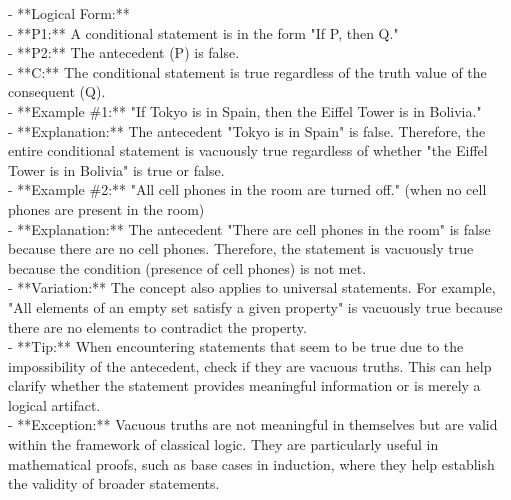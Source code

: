\documentclass[a4paper,12pt,single,pdftex]{scrbook}
\begin{document}
    
      - **Logical Form:**
    \\

    
        - **P1:** A conditional statement is in the form "If P, then Q."
    \\

    
        - **P2:** The antecedent (P) is false.
    \\

    
        - **C:** The conditional statement is true regardless of the truth value of the consequent (Q).
    \\

    
      - **Example \#1:** "If Tokyo is in Spain, then the Eiffel Tower is in Bolivia."
    \\

    
      - **Explanation:** The antecedent "Tokyo is in Spain" is false. Therefore, the entire conditional statement is vacuously true regardless of whether "the Eiffel Tower is in Bolivia" is true or false.
    \\

    
      - **Example \#2:** "All cell phones in the room are turned off." (when no cell phones are present in the room)
    \\

    
      - **Explanation:** The antecedent "There are cell phones in the room" is false because there are no cell phones. Therefore, the statement is vacuously true because the condition (presence of cell phones) is not met.
    \\

    
      - **Variation:** The concept also applies to universal statements. For example, "All elements of an empty set satisfy a given property" is vacuously true because there are no elements to contradict the property.
    \\

    
      - **Tip:** When encountering statements that seem to be true due to the impossibility of the antecedent, check if they are vacuous truths. This can help clarify whether the statement provides meaningful information or is merely a logical artifact.
    \\

    
      - **Exception:** Vacuous truths are not meaningful in themselves but are valid within the framework of classical logic. They are particularly useful in mathematical proofs, such as base cases in induction, where they help establish the validity of broader statements.
    \\
\end{document}
